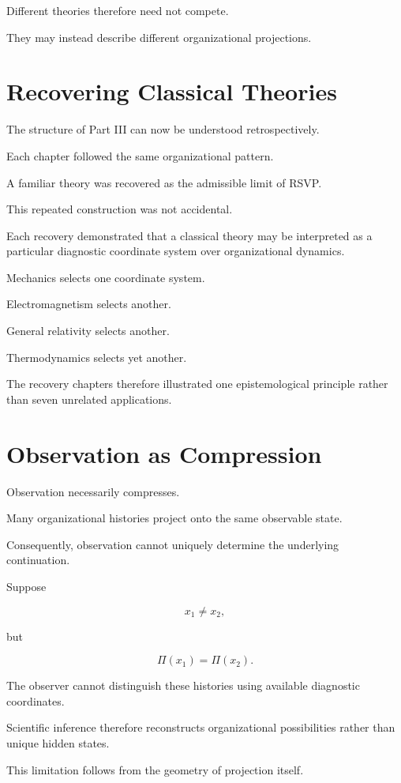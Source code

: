 \documentclass[11pt,oneside]{book}
\numberwithin{equation}{chapter}
\theoremstyle{definition}
\theoremstyle{plain}
\begin{document}
Different theories therefore need not compete.

They may instead describe different organizational projections.

\section{Recovering Classical Theories}

The structure of Part III can now be understood retrospectively.

Each chapter followed the same organizational pattern.

A familiar theory was recovered as the admissible limit of RSVP.

This repeated construction was not accidental.

Each recovery demonstrated that a classical theory may be interpreted as a
particular diagnostic coordinate system over organizational dynamics.

Mechanics selects one coordinate system.

Electromagnetism selects another.

General relativity selects another.

Thermodynamics selects yet another.

The recovery chapters therefore illustrated one epistemological principle
rather than seven unrelated applications.

\section{Observation as Compression}

Observation necessarily compresses.

Many organizational histories project onto the same observable state.

Consequently, observation cannot uniquely determine the underlying
continuation.

Suppose

\[
x_1
\neq
x_2,
\]

but

\[
\Pi(x_1)
=
\Pi(x_2).
\]

The observer cannot distinguish these histories using available diagnostic
coordinates.

Scientific inference therefore reconstructs organizational possibilities
rather than unique hidden states.

This limitation follows from the geometry of projection itself.
\end{document}
